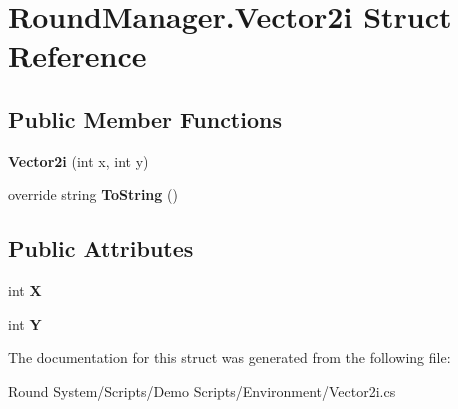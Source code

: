 \hypertarget{struct_round_manager_1_1_vector2i}{}\section{Round\+Manager.\+Vector2i Struct Reference}
\label{struct_round_manager_1_1_vector2i}
\subsection*{Public Member Functions}
\begin{DoxyCompactItemize}
\item 
\hypertarget{struct_round_manager_1_1_vector2i_add55f1af0a3bfc2c9a1e04fb741d9312}{}{\bfseries Vector2i} (int x, int y)\label{struct_round_manager_1_1_vector2i_add55f1af0a3bfc2c9a1e04fb741d9312}

\item 
\hypertarget{struct_round_manager_1_1_vector2i_adf2ca1089c6794bebb42ab68e11a475a}{}override string {\bfseries To\+String} ()\label{struct_round_manager_1_1_vector2i_adf2ca1089c6794bebb42ab68e11a475a}

\end{DoxyCompactItemize}
\subsection*{Public Attributes}
\begin{DoxyCompactItemize}
\item 
\hypertarget{struct_round_manager_1_1_vector2i_ac481f51e30916ba4f67795fecd651405}{}int {\bfseries X}\label{struct_round_manager_1_1_vector2i_ac481f51e30916ba4f67795fecd651405}

\item 
\hypertarget{struct_round_manager_1_1_vector2i_a8465aeb0550eee9797e97d8ba6ba8ecf}{}int {\bfseries Y}\label{struct_round_manager_1_1_vector2i_a8465aeb0550eee9797e97d8ba6ba8ecf}

\end{DoxyCompactItemize}


The documentation for this struct was generated from the following file\+:\begin{DoxyCompactItemize}
\item 
Round System/\+Scripts/\+Demo Scripts/\+Environment/Vector2i.\+cs\end{DoxyCompactItemize}
